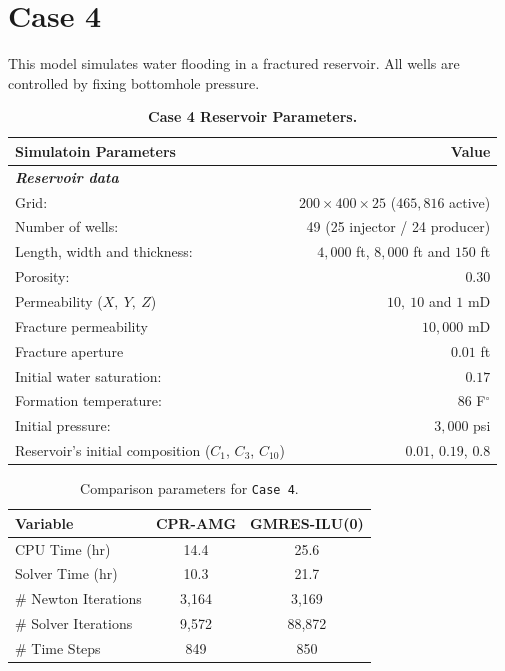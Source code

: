 \section{Case 4}
This model simulates water flooding in a fractured reservoir. All wells are controlled by fixing bottomhole pressure.
\FloatBarrier
\begin{center}
\begin{table}[h!]
\begin{adjustbox}{width=0.7\textwidth}
    \begin{threeparttable}
    \caption{\textbf{Case 4 Reservoir Parameters\supercite{phdfernandes}.}}
    \label{case4}
        \begin{tabular}{l r }
            \toprule
            Simulatoin Parameters & Value\\
            \midrule
	\rowcolor{red!20}\textit{\textbf{Reservoir data}}      & \\
	Grid:      &           $200\times400\times25$ ($465,816$ active) \\
	\rowcolor{blue!5}Number of wells:      &  49 (25 injector / 24 producer) \\
	Length, width and thickness:      & $4,000$ ft, $8,000$ ft and $150$ ft\\
	\rowcolor{blue!5}Porosity:       &          $0.30$ \\
	Permeability ($X, \ Y, \ Z$) & $10, \ 10$ and $1$ mD\\
	\rowcolor{blue!5}Fracture permeability & $10,000$ mD\\
	Fracture aperture	& $0.01$ ft\\
	\rowcolor{blue!5}Initial water saturation:    & $0.17$ \\      
	Formation temperature:    & $86$ F$^{\circ}$     \\
	\rowcolor{blue!5}Initial pressure:    &      $3,000$ psi\\
	Reservoir’s initial composition ($C_{1}$, $C_{3}$, $C_{10}$) & $0.01$, $0.19$, $0.8$\\
        \bottomrule
        \end{tabular}
    \end{threeparttable}
\end{adjustbox}    
\end{table}
\end{center}
\FloatBarrier

\begin{table}[h!]
   \caption{Comparison parameters for \texttt{Case 4}.}
   \label{case4-tab}
   \small
   \centering
   \begin{tabular}{lcc}
   \toprule\toprule
   \textbf{Variable} & \textbf{CPR-AMG} & \textbf{GMRES-ILU(0)} \\
   \midrule
   CPU Time (hr) & 14.4 & 25.6 \\
   Solver Time (hr) & 10.3 & 21.7 \\
   \# Newton Iterations & 3,164 & 3,169 \\
   \# Solver Iterations & 9,572 & 88,872 \\
   \# Time Steps & 849 & 850 \\
   \bottomrule
   \end{tabular}
\end{table}

